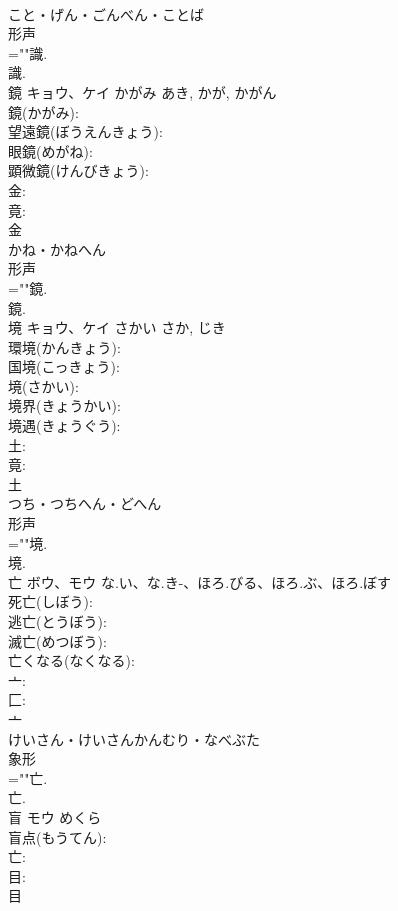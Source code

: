 \documentclass[8pt]{extreport}
\begin{document}
\begin{CJK}{UTF8}{min}
\\	こと・げん・ごんべん・ことば	
\\	形声 
\\	=""識.
\\	識.
\\	鏡	キョウ、ケイ	かがみ	あき, かが, かがん	
\\	鏡(かがみ): 
\\	望遠鏡(ぼうえんきょう): 
\\	眼鏡(めがね): 
\\	顕微鏡(けんびきょう): 
\\	金: 
\\	竟: 
\\	金	
\\	かね・かねへん	
\\	形声 
\\	=""鏡.
\\	鏡.
\\	境	キョウ、ケイ	さかい	さか, じき	
\\	環境(かんきょう): 
\\	国境(こっきょう): 
\\	境(さかい): 
\\	境界(きょうかい): 
\\	境遇(きょうぐう): 
\\	土: 
\\	竟: 
\\	土	
\\	つち・つちへん・どへん	
\\	形声 
\\	=""境.
\\	境.
\\	亡	ボウ、モウ	な.い、な.き-、ほろ.びる、ほろ.ぶ、ほろ.ぼす		
\\	死亡(しぼう): 
\\	逃亡(とうぼう): 
\\	滅亡(めつぼう): 
\\	亡くなる(なくなる): 
\\	亠: 
\\	匚: 
\\	亠	
\\	けいさん・けいさんかんむり・なべぶた	
\\	象形 
\\	=""亡.
\\	亡.
\\	盲	モウ	めくら		
\\	盲点(もうてん): 
\\	亡: 
\\	目: 
\\	目	

\end{CJK}
\end{document}
